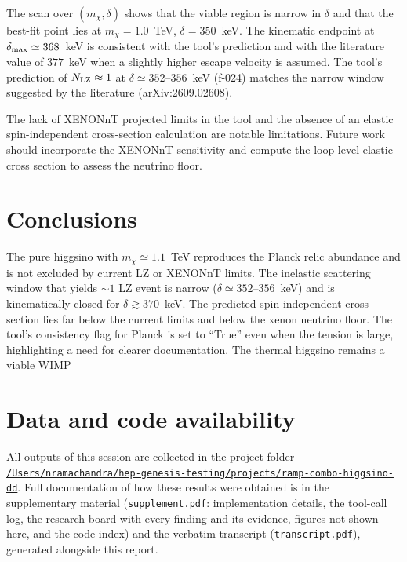 \documentclass[11pt,a4paper]{article}
\begin{document}
The scan over $(m_\chi,\delta)$ shows that the viable region is narrow in $\delta$ and that the best-fit point lies at $m_\chi=1.0$~TeV, $\delta=350$~keV.  The kinematic endpoint at $\delta_{\rm max}\simeq368$~keV is consistent with the tool's prediction and with the literature value of $377$~keV when a slightly higher escape velocity is assumed.  The tool's prediction of $N_{\rm LZ}\approx1$ at $\delta\simeq352$--$356$~keV (f-024) matches the narrow window suggested by the literature (arXiv:2609.02608).

The lack of XENONnT projected limits in the tool and the absence of an elastic spin-independent cross-section calculation are notable limitations.  Future work should incorporate the XENONnT sensitivity and compute the loop-level elastic cross section to assess the neutrino floor.

\section{Conclusions}
The pure higgsino with $m_\chi\simeq1.1$~TeV reproduces the Planck relic abundance and is not excluded by current LZ or XENONnT limits.  The inelastic scattering window that yields $\sim1$ LZ event is narrow ($\delta\simeq352$--$356$~keV) and is kinematically closed for $\delta\gtrsim370$~keV.  The predicted spin-independent cross section lies far below the current limits and below the xenon neutrino floor.  The tool's consistency flag for Planck is set to ``True'' even when the tension is large, highlighting a need for clearer documentation.  The thermal higgsino remains a viable WIMP

\section*{Data and code availability}
All outputs of this session are collected in the project folder \href{file:///Users/nramachandra/hep-genesis-testing/projects/ramp-combo-higgsino-dd}{\texttt{/\allowbreak{}Users/\allowbreak{}nramachandra/\allowbreak{}hep-genesis-testing/\allowbreak{}projects/\allowbreak{}ramp-combo-higgsino-dd}}.
Full documentation of how these results were obtained is in the supplementary material (\texttt{supplement.pdf}: implementation details, the tool-call log, the research board with every finding and its evidence, figures not shown here, and the code index) and the verbatim transcript (\texttt{transcript.pdf}), generated alongside this report.
\end{document}
